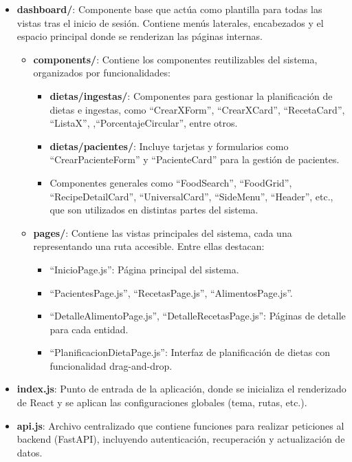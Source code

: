 \begin{itemize}
\begin{itemize}
        \item \textbf{dashboard/}: Componente base que actúa como plantilla para todas las vistas tras el inicio de sesión. Contiene menús laterales, encabezados y el espacio principal donde se renderizan las páginas internas.
        \begin{itemize}
            \item \textbf{components/}: Contiene los componentes reutilizables del sistema, organizados por funcionalidades:
            \begin{itemize}
                \item \textbf{dietas/ingestas/}: Componentes para gestionar la planificación de dietas e ingestas, como ``CrearXForm'', ``CrearXCard'', ``RecetaCard'', ``ListaX'', ,``PorcentajeCircular'', entre otros.
                \item \textbf{dietas/pacientes/}: Incluye tarjetas y formularios como ``CrearPacienteForm'' y ``PacienteCard'' para la gestión de pacientes.
                \item Componentes generales como ``FoodSearch'', ``FoodGrid'', ``RecipeDetailCard'', ``UniversalCard'', ``SideMenu'', ``Header'', etc., que son utilizados en distintas partes del sistema.
            \end{itemize}
            \item \textbf{pages/}: Contiene las vistas principales del sistema, cada una representando una ruta accesible. Entre ellas destacan:
            \begin{itemize}
                \item ``InicioPage.js'': Página principal del sistema.
                \item ``PacientesPage.js'', ``RecetasPage.js'', ``AlimentosPage.js''.
                \item ``DetalleAlimentoPage.js'', ``DetalleRecetasPage.js'': Páginas de detalle para cada entidad.
                \item ``PlanificacionDietaPage.js'': Interfaz de planificación de dietas con funcionalidad drag-and-drop.
            \end{itemize}
        \end{itemize}
    \item \textbf{index.js}: Punto de entrada de la aplicación, donde se inicializa el renderizado de React y se aplican las configuraciones globales (tema, rutas, etc.).

    \item \textbf{api.js}: Archivo centralizado que contiene funciones para realizar peticiones al backend (FastAPI), incluyendo autenticación, recuperación y actualización de datos.
    \end{itemize}
  \end{itemize}

